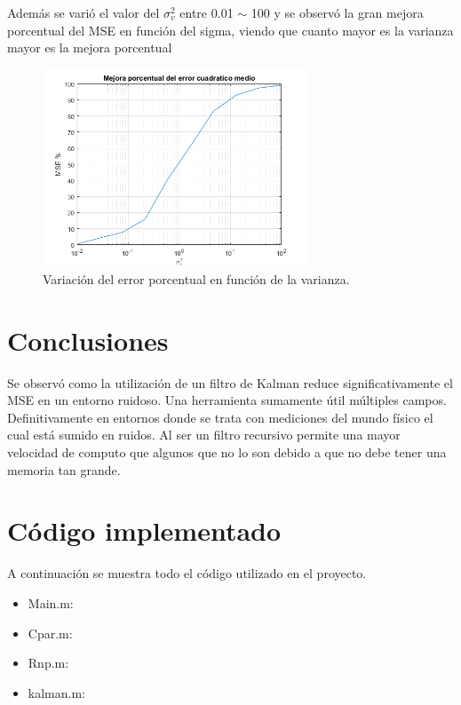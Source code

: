 Además se varió el valor del $\sigma_v^2$ entre 0.01 $\sim$ 100 y se observó la gran mejora porcentual del MSE en función del sigma, viendo que cuanto mayor es la varianza mayor es la mejora porcentual 
\begin{figure}[H]
\centering
	\includegraphics[width=0.7\textwidth, trim = {0 0 0 0},clip]{./Imagenes/Error_porcentual.png}
	\caption{Variación del error porcentual en función de la varianza.}
	\label{fig:errorporcent}
\end{figure}

\section{Conclusiones}
Se observó como la utilización de un filtro de Kalman reduce significativamente el MSE en un entorno ruidoso. Una herramienta sumamente útil múltiples campos. Definitivamente en entornos donde se trata con mediciones del mundo físico el cual está sumido en ruidos.
Al ser un filtro recursivo permite una mayor velocidad de computo que algunos que no lo son debido a que no debe tener una memoria tan grande.

\section{Código implementado}
A continuación se muestra todo el código utilizado en el proyecto.
\begin{itemize}
\item Main.m:
	
	
\item Cpar.m:
	
	
\item Rnp.m:
	
	
\item kalman.m:
	

\end{itemize}

